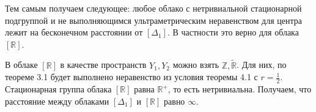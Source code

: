 Тем самым получаем следующее: любое облако с нетривиальной стационарной подгруппой
и не выполняющимся ультраметрическим неравенством для центра лежит
на бесконечном расстоянии от $[\Delta_{1}]$. В частности это верно
для облака $[\mathbb{R}]$.

\begin{corollary}
	В облаке $[\mathbb{R}]$ в качестве пространств $Y_{1}, Y_{2}$ можно взять
$\mathbb{Z}, \widetilde{\mathbb{R}}$. Для них, по теореме 3.1 будет выполнено
неравенство из условия теоремы 4.1 с $r = \frac 1 2$. Стационарная группа облака
$[\mathbb{R}]$ равна $\mathbb{R}^{+}$, то есть нетривиальна. Получаем, что расстояние между облаками
$[\Delta_{1}]$ и $[\mathbb{R}]$ равно $\infty$.
\end{corollary}
